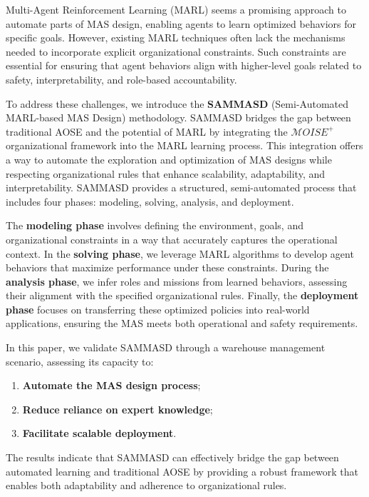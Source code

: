 \documentclass[conference]{IEEEtran}
\begin{document}
Multi-Agent Reinforcement Learning (MARL) seems a promising approach to automate parts of MAS design, enabling agents to learn optimized behaviors for specific goals. However, existing MARL techniques often lack the mechanisms needed to incorporate explicit organizational constraints. Such constraints are essential for ensuring that agent behaviors align with higher-level goals related to safety, interpretability, and role-based accountability.

To address these challenges, we introduce the \textbf{SAMMASD} (Semi-Automated MARL-based MAS Design) methodology. SAMMASD bridges the gap between traditional AOSE and the potential of MARL by integrating the $\mathcal{M}OISE^+$~\cite{Hubner2007} organizational framework into the MARL learning process. This integration offers a way to automate the exploration and optimization of MAS designs while respecting organizational rules that enhance scalability, adaptability, and interpretability. SAMMASD provides a structured, semi-automated process that includes four phases: modeling, solving, analysis, and deployment.

The \textbf{modeling phase} involves defining the environment, goals, and organizational constraints in a way that accurately captures the operational context. In the \textbf{solving phase}, we leverage MARL algorithms to develop agent behaviors that maximize performance under these constraints. During the \textbf{analysis phase}, we infer roles and missions from learned behaviors, assessing their alignment with the specified organizational rules. Finally, the \textbf{deployment phase} focuses on transferring these optimized policies into real-world applications, ensuring the MAS meets both operational and safety requirements.

In this paper, we validate SAMMASD through a warehouse management scenario, assessing its capacity to:
%
\begin{enumerate}[label={\roman*)}]
  \item \textbf{Automate the MAS design process};
  \item \textbf{Reduce reliance on expert knowledge};
  \item \textbf{Facilitate scalable deployment}.
\end{enumerate}

\noindent The results indicate that SAMMASD can effectively bridge the gap between automated learning and traditional AOSE by providing a robust framework that enables both adaptability and adherence to organizational rules.
\end{document}
